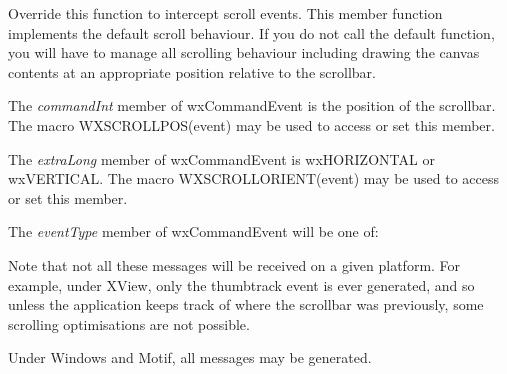 \label{wxcanvasonscroll}


Override this function to intercept scroll events. This
member function implements the default scroll behaviour. If
you do not call the default function, you will have to manage
all scrolling behaviour including drawing the canvas contents
at an appropriate position relative to the scrollbar.

The {\it commandInt} member of wxCommandEvent is the
position of the scrollbar. The macro WXSCROLLPOS(event) may
be used to access or set this member.

The {\it extraLong} member of wxCommandEvent is wxHORIZONTAL
or wxVERTICAL. The macro WXSCROLLORIENT(event) may be used
to access or set this member.

The {\it eventType} member of wxCommandEvent will be one of:

\begin{twocollist}\itemsep=0pt
\end{twocollist}

Note that not all these messages will be received on a given
platform. For example, under XView, only the thumbtrack event
is ever generated, and so unless the application keeps track of
where the scrollbar was previously, some scrolling optimisations are not
possible.

Under Windows and Motif, all messages may be generated.



